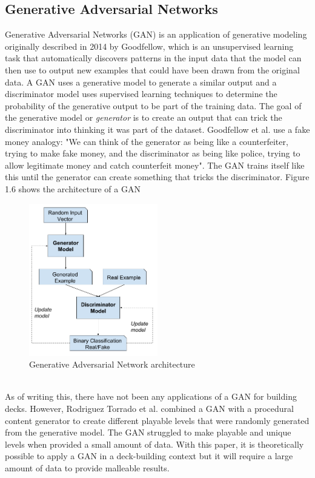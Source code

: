 \documentclass{report} %
\begin{document}
\subsection{Generative Adversarial Networks}
Generative Adversarial Networks (GAN) is an application of generative modeling originally described in 2014 by Goodfellow\cite{NIPS2014}, which is an unsupervised learning task that automatically discovers patterns in the input data that the model can then use to output new examples that could have been drawn from the original data. A GAN uses a generative model to generate a similar output and a discriminator model uses supervised learning techniques to determine the probability of the generative output to be part of the training data\cite{NIPS2014}. The goal of the generative model or \textit{generator} is to create an output that can trick the discriminator into thinking it was part of the dataset. Goodfellow et al. use a fake money analogy: "We can think of the generator as being like a counterfeiter, trying to make fake money, and the discriminator as being like police, trying to allow legitimate money and catch counterfeit money"\cite{NIPS2016}. The GAN trains itself like this until the generator can create something that tricks the discriminator. Figure 1.6 shows the architecture of a GAN\\ 
\begin{figure}[h]
\centering
\includegraphics[width=0.5\textwidth]{GAN}
\caption{Generative Adversarial Network architecture\protect\footnotemark}
\end{figure}
\\
\indent As of writing this, there have not been any applications of a GAN for building decks. However, Rodriguez Torrado et al. combined a GAN with a procedural content generator to create different playable levels that were randomly generated from the generative model\cite{VGLG}. The GAN struggled to make playable and unique levels when provided a small amount of data. With this paper, it is theoretically possible to apply a GAN in a deck-building context but it will require a large amount of data to provide malleable results. 
\end{document}
